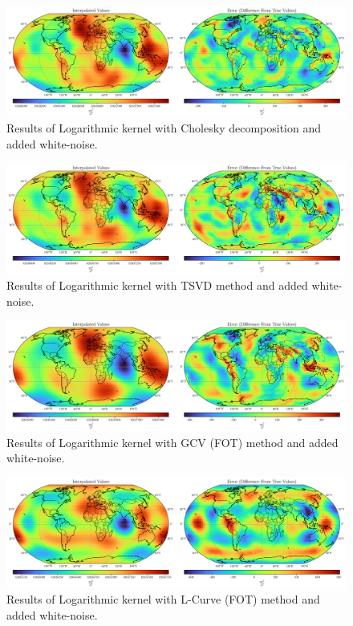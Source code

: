 \documentclass[12pt]{article}
\begin{document}
	
	\begin{figure}[h!]
		\centering
		\includegraphics[width=16cm]{../Outputs/Plots/Plot_wn_Abel-Poisson_Cholesky.pdf}
		\caption{Results of Logarithmic kernel with Cholesky decomposition and added white-noise.}
		\label{fig:wn_Abel-Poisson_Chol}
	\end{figure}
	
	\begin{figure}[h!]
		\centering
		\includegraphics[width=16cm]{../Outputs/Plots/Plot_wn_Abel-Poisson_TSVD.pdf}
		\caption{Results of Logarithmic kernel with TSVD method and added white-noise.}
		\label{fig:wn_Abel-Poisson_TSVD}
	\end{figure}
	
	
	\begin{figure}[h!]
		\centering
		\includegraphics[width=16cm]{../Outputs/Plots/Plot_wn_Abel-Poisson_GCV.pdf}
		\caption{Results of Logarithmic kernel with GCV (FOT) method and added white-noise.}
		\label{fig:wn_Abel-Poisson_GCV}
	\end{figure}
	
	\begin{figure}[h!]
		\centering
		\includegraphics[width=16cm]{../Outputs/Plots/Plot_wn_Abel-Poisson_L-Curve.pdf}
		\caption{Results of Logarithmic kernel with L-Curve (FOT) method and added white-noise.}
		\label{fig:wn_Abel-Poisson_L-Curve}
	\end{figure}
	
\end{document}
